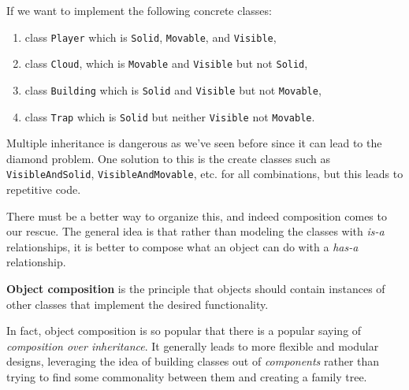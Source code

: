 \begin{example}
    If we want to implement the following concrete classes: 
    \begin{enumerate}
      \item class \texttt{Player} which is \texttt{Solid}, \texttt{Movable}, and \texttt{Visible}, 
      \item class \texttt{Cloud}, which is \texttt{Movable} and \texttt{Visible} but not \texttt{Solid}, 
      \item class \texttt{Building} which is \texttt{Solid} and \texttt{Visible} but not \texttt{Movable}, 
      \item class \texttt{Trap} which is \texttt{Solid} but neither \texttt{Visible} not \texttt{Movable}. 
    \end{enumerate} 
    Multiple inheritance is dangerous as we've seen before since it can lead to the diamond problem. One solution to this is the create classes such as \texttt{VisibleAndSolid}, \texttt{VisibleAndMovable}, etc. for all combinations, but this leads to repetitive code. 
  \end{example}

  There must be a better way to organize this, and indeed composition comes to our rescue. The general idea is that rather than modeling the classes with \textit{is-a} relationships, it is better to compose what an object can do with a \textit{has-a} relationship. 

  \begin{definition}
    \textbf{Object composition} is the principle that objects should contain instances of other classes that implement the desired functionality. 
  \end{definition} 

  \begin{definition}[Delegation]
    
  \end{definition}

  In fact, object composition is so popular that there is a popular saying of \textit{composition over inheritance}. It generally leads to more flexible and modular designs, leveraging the idea of building classes out of \textit{components} rather than trying to find some commonality between them and creating a family tree. 



